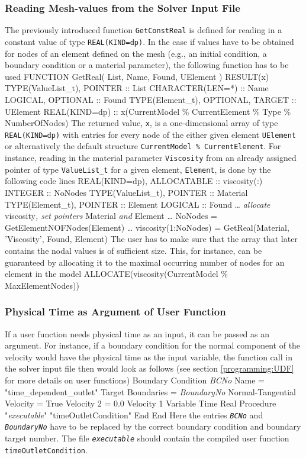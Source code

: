 \subsubsection{Reading Mesh-values from the Solver Input File}
The previously introduced function \texttt{GetConstReal} is defined for reading in a constant value of type \texttt{REAL(KIND=dp)}. In the case if values have to be obtained for nodes of an element defined on the mesh (e.g., an initial condition, a boundary condition or a material parameter), the following function has to be used
\ttbegin
FUNCTION GetReal( List, Name, Found, UElement ) RESULT(x)
   TYPE(ValueList_t), POINTER :: List
   CHARACTER(LEN=*) :: Name
   LOGICAL, OPTIONAL :: Found
   TYPE(Element_t), OPTIONAL, TARGET :: UElement
   REAL(KIND=dp) :: x(CurrentModel \% CurrentElement \% Type \% NumberOfNodes)
\ttend
The returned value, \texttt{x}, is a one-dimensional array of type \texttt{REAL(KIND=dp)} with entries for every node of the either given element \texttt{UElement} or alternatively the default structure \texttt{CurrentModel \% CurrentElement}. For instance, reading in the material parameter \texttt{Viscosity} from an already assigned pointer of type \texttt{ValueList\_t} for a given element, \texttt{Element}, is done by the following code lines
\ttbegin
REAL(KIND=dp), ALLOCATABLE :: viscosity(:)
INTEGER :: NoNodes
TYPE(ValueList_t), POINTER :: Material
TYPE(Element_t), POINTER :: Element
LOGICAL :: Found
\ldots
\textit{allocate} viscosity\textit{, set pointers} Material \textit{and} Element
\ldots
NoNodes = GetElementNOFNodes(Element)
\ldots
viscosity(1:NoNodes) = GetReal(Material, 'Viscosity', Found, Element)
\ttend
The user has to make sure that the array that later contains the nodal values is of sufficient size. This, for instance, can be guaranteed by allocating it to the maximal occurring number of nodes for an element in the model
\ttbegin
ALLOCATE(viscosity(CurrentModel \% MaxElementNodes))
\ttend
\subsubsection{Physical Time as Argument of User Function}
If a user function needs physical time as an input, it can be passed as an argument. For instance, if a boundary condition for the normal component of the velocity would have the physical time as the input variable, the function call in the solver input file then would look as follows (see section \ref{programming:UDF} for more details on user functions)
\ttbegin
Boundary Condition \textit{BCNo}
  Name = "time_dependent_outlet"
  Target Boundaries = \textit{BoundaryNo}
  Normal-Tangential Velocity = True
  Velocity 2 = 0.0
  Velocity 1
   Variable Time
   Real Procedure  "\textit{executable}" "timeOutletCondition"
  End
End
\ttend
Here the entries \texttt{\textit{BCNo}} and \texttt{\textit{BoundaryNo}} have to be replaced by the correct boundary condition and boundary target number. The file \texttt{\textit{executable}} should contain the compiled user function \texttt{timeOutletCondition}.
